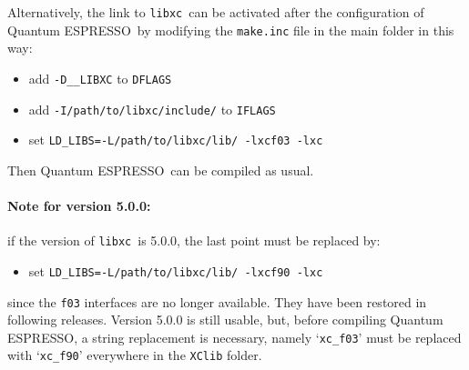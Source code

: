 \documentclass[12pt,a4paper]{article}
\def\qe{{\sc Quantum ESPRESSO}}
\def\libxc{\texttt{libxc}}
\begin{document}
Alternatively, the link to \libxc\ can be activated after the configuration of  \qe\ by modifying the \texttt{make.inc} file in the main folder in this way:
\begin{itemize}
	\item add \texttt{-D\_\_LIBXC} to \texttt{DFLAGS}
	\item add \texttt{-I/path/to/libxc/include/} to \texttt{IFLAGS}
	\item set \texttt{LD\_LIBS=-L/path/to/libxc/lib/ -lxcf03 -lxc}
\end{itemize}
Then \qe\ can be compiled as usual.

\paragraph{Note for version 5.0.0:} if the version of \libxc\ is 5.0.0, the last point must be replaced by:
\begin{itemize}
	\item set \texttt{LD\_LIBS=-L/path/to/libxc/lib/ -lxcf90 -lxc}
\end{itemize}
since the \texttt{f03} interfaces are no longer available. They have been restored in following releases. Version 5.0.0 is still usable, but, before compiling \qe, a string replacement is necessary, namely `\texttt{xc\_f03}' must be replaced with `\texttt{xc\_f90}' everywhere in the \texttt{XClib} folder.
\end{document}

